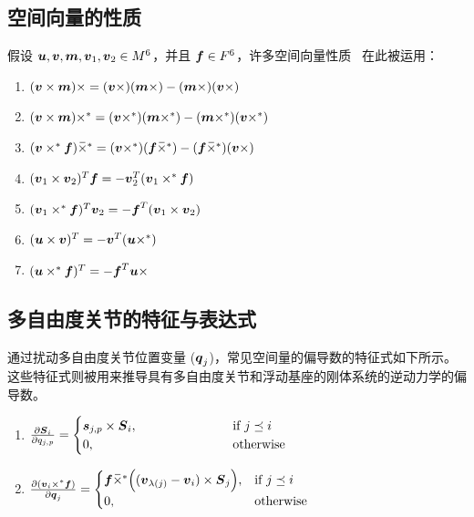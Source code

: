 \documentclass[letterpaper, 10 pt, conference]{ieeetran}  %
\begin{document}
{\subsection{空间向量的性质}
\label{props}
假设 $\boldsymbol{u},\boldsymbol{v},\boldsymbol{m},\boldsymbol{v}_{1},\boldsymbol{v}_{2} \in M^{6}$，并且 $\boldsymbol{f} \in F^{6}$，许多空间向量性质~\cite{rbd} 在此被运用：

\begin{enumerate}[label=P{{\arabic*}}.]
    \item $(\boldsymbol{v} \times \boldsymbol{m}) \times = (\boldsymbol{v} \times )( \boldsymbol{m} \times) - (\boldsymbol{m} \times)(\boldsymbol{v} \times)$ 
    \item $(\boldsymbol{v} \times \boldsymbol{m}) \times^{*} = (\boldsymbol{v} \times^{*} )( \boldsymbol{m} \times^*) - (\boldsymbol{m} \times^*)(\boldsymbol{v} \times^*)$ 
    \item $(\boldsymbol{v} \times^{*} \boldsymbol{f}) \,\overline{\!\times\!}{}^{\,*} = (\boldsymbol{v} \times^{*} )(\boldsymbol{f} \,\overline{\!\times\!}{}^{\,*}) - (\boldsymbol{f} \,\overline{\!\times\!}{}^{\,*})(\boldsymbol{v} \times)$ 
    \item $(\boldsymbol{v}_{1} \times \boldsymbol{v}_2)^{T}\boldsymbol{f} = -\boldsymbol{v}_2^T (\boldsymbol{v}_1 \times^* \boldsymbol{f})  $
    \item $(\boldsymbol{v}_1 \times^* \boldsymbol{f})^T \boldsymbol{v}_2 = -\boldsymbol{f}^T(\boldsymbol{v}_1 \times \boldsymbol{v}_2)$
    \item $(\boldsymbol{u} \times \boldsymbol{v})^T  = -\boldsymbol{v}^{T}(\boldsymbol{u} \times^*) $
    \item $(\boldsymbol{u} \times^* \boldsymbol{f}) ^T = -\boldsymbol{f} ^T \boldsymbol{u} \times$
\end{enumerate}


\subsection{多自由度关节的特征与表达式}
\label{multi_dof_iden}
通过扰动多自由度关节位置变量 ($\boldsymbol{q}_{j}$)，常见空间量的偏导数的特征式如下所示。这些特征式则被用来推导具有多自由度关节和浮动基座的刚体系统的逆动力学的偏导数。

\begin{enumerate}[label=J{{\arabic*}}.]

         \item $\frac{\partial \boldsymbol{S}_{i}}{\partial q_{j,p}}=
        \begin{cases}
          \boldsymbol{s}_{j,p} \times \boldsymbol{S}_{i} , &~~~~~~~~~~~~~~~~~~~~ \text{if}\ j \preceq i \\
          0, &~~~~~~~~~~~~~~~~~~~~ \text{otherwise}
        \end{cases}$

       \item $ \frac{\partial (\boldsymbol{v}_{i} \times^{*} \boldsymbol{f})}{\partial \boldsymbol{q}_{j}}=
        \begin{cases}
         \boldsymbol{f} \,\overline{\!\times\!}{}^{\,*} \Big( (\boldsymbol{v}_{\lambda(j)} - \boldsymbol{v}_{i})  \times \boldsymbol{S}_{j} \Big) ,  & \text{if}\ j \preceq i \\
          0,  & \text{otherwise}
        \end{cases}$
   

\end{enumerate}}
\end{document}
